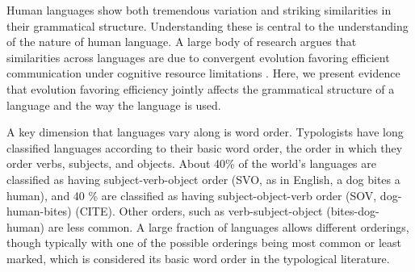 \documentclass[11pt,a4paper]{article}
\newcommand\comment[1]{{\color{red}#1}}
\begin{document}





Human languages show both tremendous variation and striking similarities in their grammatical structure. Understanding these is central to the understanding of the nature of human language.
A large body of research argues that similarities across languages are due to convergent evolution favoring efficient communication under cognitive resource limitations \citep{haspelmath2008parametric}.
Here, we present evidence that evolution favoring efficiency jointly affects the grammatical structure of a language and the way the language is used.

A key dimension that languages vary along is word order.
Typologists have long classified languages according to their basic word order, the order in which they order verbs, subjects, and objects.
About 40\% of the world's languages are classified as having subject-verb-object order ({SVO}, as in English, a dog bites a human), and 40 \% are classified as having subject-object-verb order ({SOV}, dog-human-bites) (CITE).
Other orders, such as verb-subject-object (bites-dog-human) are less common.
A large fraction of languages allows different orderings, though typically with one of the possible orderings being most common or least marked, which is considered its basic word order in the typological literature.
\end{document}
